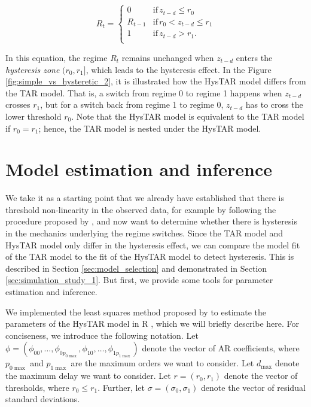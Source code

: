 \documentclass{article}
\begin{document}
\begin{equation} \label{eqn:hysteretic_switching}
R_t = \begin{cases}
0 & \mathrm{if} \, z_{t-d} \le r_0 \\
R_{t-1} & \mathrm{if} \, r_0 < z_{t-d} \le r_1 \\
1 & \mathrm{if} \, z_{t-d} > r_1. \\
\end{cases}
\end{equation}

In this equation, the regime $R_t$ remains unchanged when $z_{t-d}$ enters the \textit{hysteresis zone} $(r_0, r_1]$, which leads to the hysteresis effect. In the Figure \ref{fig:simple_vs_hysteretic_2}, it is illustrated how the HysTAR model differs from the TAR model.
That is, a switch from regime 0 to regime 1 happens when $z_{t-d}$ crosses $r_1$, but for a switch back from regime 1 to regime 0, $z_{t-d}$ has to cross the lower threshold $r_0$.
Note that the HysTAR model is equivalent to the TAR model if $r_0 = r_1$; hence, the TAR model is nested under the HysTAR model.

\section{Model estimation and inference}
\label{sec:LS_estimation}
We take it as a starting point that we already have established that there is threshold non-linearity in the observed data, for example by following the procedure proposed by \citet{testing_for_threshold_nonlinearity}, and now want to determine whether there is hysteresis in the mechanics underlying the regime switches.
Since the TAR model and HysTAR model only differ in the hysteresis effect, we can compare the model fit of the TAR model to the fit of the HysTAR model to detect hysteresis. This is described in Section \ref{sec:model_selection} and demonstrated in Section \ref{sec:simulation_study_1}.
But first, we provide some tools for parameter estimation and inference.

We implemented the least squares method proposed by \citet{bar2} to estimate the parameters of the HysTAR model in \textsf{R} \citep{R, R_hystar}, which we will briefly describe here.
For conciseness, we introduce the following notation.
Let $\phi = (\phi_{00}, \dots, \phi_{0 p_{0\max}}, \phi_{10}, \dots, \phi_{1 p_{1\max}})$ denote the  vector of AR coefficients, where $p_{0\max}$ and $p_{1\max}$ are the maximum orders we want to consider.
Let $d_{\max}$ denote the maximum delay we want to consider.
Let $r = (r_0, r_1)$ denote the vector of thresholds, where $r_0 \le r_1$.
Further, let $\sigma = (\sigma_{0}, \sigma_{1})$ denote the  vector of residual standard deviations.
\end{document}
